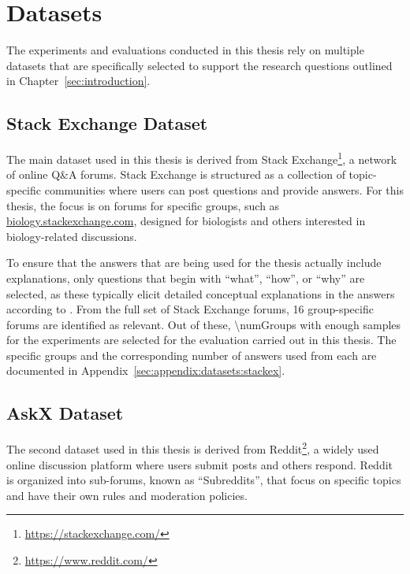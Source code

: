 \chapter{Datasets}%
\label{sec:datasets}

The experiments and evaluations conducted in this thesis rely on multiple datasets that are specifically selected to support the research questions outlined in Chapter~\ref{sec:introduction}.

\section{Stack Exchange Dataset}%
\label{sec:datasets:stackex}
The main dataset used in this thesis is derived from Stack Exchange\footnote{\url{https://stackexchange.com/}}, a network of online Q\&A forums. Stack Exchange is structured as a collection of topic-specific communities where users can post questions and provide answers. For this thesis, the focus is on forums for specific groups, such as \url{biology.stackexchange.com}, designed for biologists and others interested in biology-related discussions.

To ensure that the answers that are being used for the thesis actually include explanations, only questions that begin with \enquote{what}, \enquote{how}, or \enquote{why} are selected, as these typically elicit detailed conceptual explanations in the answers according to \citet{millerExplanationArtificialIntelligence2019}. From the full set of Stack Exchange forums, \num{16} group-specific forums are identified as relevant.
Out of these, \num{\numGroups} with enough samples for the experiments are selected for the evaluation carried out in this thesis. The specific groups and the corresponding number of answers used from each are documented in Appendix~\ref{sec:appendix:datasets:stackex}.
\raggedbottom

\section{AskX Dataset}%
\label{sec:datasets:askx}
The second dataset used in this thesis is derived from Reddit\footnote{\url{https://www.reddit.com/}}, a widely used online discussion platform where users submit posts and others respond. Reddit is organized into sub-forums, known as \enquote{Subreddits}, that focus on specific topics and have their own rules and moderation policies.


